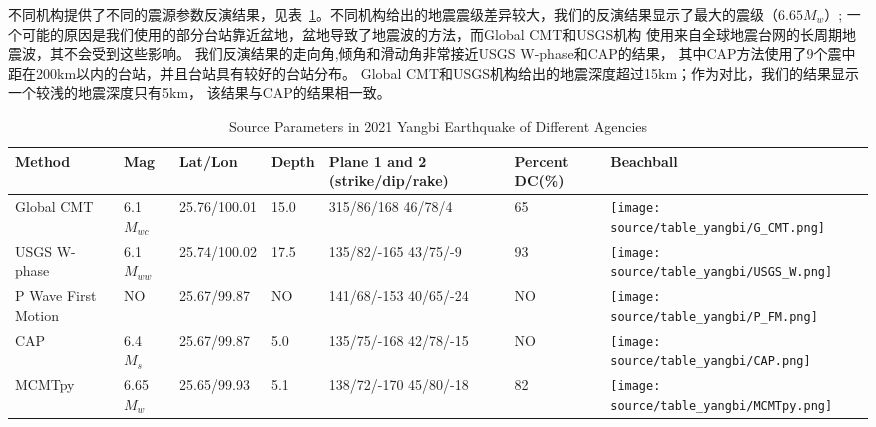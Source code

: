 不同机构提供了不同的震源参数反演结果，见表~\ref{tab:yangbi-1}。不同机构给出的地震震级差异较大，我们的反演结果显示了最大的震级（$6.65M_w$）;
一个可能的原因是我们使用的部分台站靠近盆地，盆地导致了地震波的方法，而Global CMT和USGS机构
使用来自全球地震台网的长周期地震波，其不会受到这些影响。
我们反演结果的走向角,倾角和滑动角非常接近USGS W-phase和CAP\citep{Long2021}的结果，
其中CAP方法使用了9个震中距在200km以内的台站，并且台站具有较好的台站分布。
Global CMT和USGS机构给出的地震深度超过15km；作为对比，我们的结果显示一个较浅的地震深度只有5km，
该结果与CAP的结果相一致\citep{Long2021}。

\begin{table}[h]
  \centering
  \caption{Source Parameters in 2021 Yangbi Earthquake of Different Agencies}
  \label{tab:yangbi-1}
    \centering%
    \begin{tabular}{m{2cm}<{\centering}m{1.5cm}<{\centering}m{2cm}<{\centering}m{1cm}<{\centering}m{2cm}<{\centering}m{1cm}<{\centering}m{2cm}<{\centering}}

    \toprule
    Method   & Mag & Lat/Lon & Depth & Plane 1 and 2 (strike/dip/rake) & Percent DC(\%) & Beachball    \\

    \midrule
    Global CMT &  6.1 $M_{wc}$ & 25.76/100.01 & 15.0 & 315/86/168 46/78/4 & 65 & \texttt{[image: source/table\_yangbi/G\_CMT.png]} \\
    
    USGS W-phase & 6.1 $M_{ww}$ & 25.74/100.02 & 17.5 & 135/82/-165 43/75/-9 & 93 & \texttt{[image: source/table\_yangbi/USGS\_W.png]} \\
    
    P Wave First Motion &  NO & 25.67/99.87 & NO & 141/68/-153 40/65/-24 & NO & \texttt{[image: source/table\_yangbi/P\_FM.png]} \\
    
    CAP &  6.4 $M_{s}$ & 25.67/99.87 & 5.0 & 135/75/-168 42/78/-15 & NO & \texttt{[image: source/table\_yangbi/CAP.png]} \\
    
    MCMTpy & 6.65 $M_{w}$ & 25.65/99.93 & 5.1 & 138/72/-170 45/80/-18  & 82 & \texttt{[image: source/table\_yangbi/MCMTpy.png]} \\
    
    \bottomrule
  \end{tabular}
\end{table}



